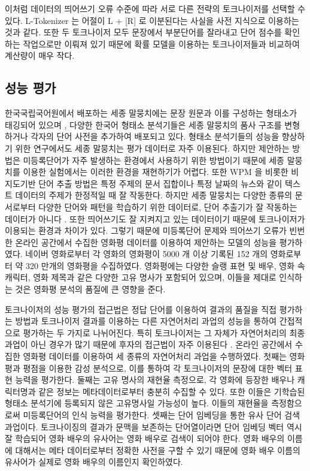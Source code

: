 \documentclass[11pt]{article}
\begin{document}
이처럼 데이터의 띄어쓰기 오류 수준에 따라 서로 다른 전략의 토크나이저를 선택할 수 있다.
L-Tokenizer 는 어절이 L + [R] 로 이분된다는 사실을 사전 지식으로 이용하는 것과 같다.
또한 두 토크나이저 모두 문장에서 부분단어를 잘라내고 단어 점수를 확인하는 작업으로만 이뤄져 있기 때문에 확률 모델을 이용하는 토크나이저들과 비교하여 계산량이 매우 작다.


\subsection{성능 평가}
한국국립국어원에서 배포하는 세종 말뭉치에는 문장 원문과 이를 구성하는 형태소가 태깅되어 있으며 \citep{kim200121st}, 다양한 한국어 형태소 분석기들은 세종 말뭉치의 품사 구조를 변형하거나 각자의 단어 사전을 추가하여 배포되고 있다.
형태소 분석기들의 성능을 향상하기 위한 연구에서도 세종 말뭉치는 평가 데이터로 자주 이용된다.
하지만 제안하는 방법은 미등록단어가 자주 발생하는 환경에서 사용하기 위한 방법이기 때문에 세종 말뭉치를 이용한 실험에서는 이러한 환경을 재현하기가 어렵다.
또한 WPM 을 비롯한 비지도기반 단어 추출 방법은 특정 주제의 문서 집합이나 특정 날짜의 뉴스와 같이 텍스트 데이터의 주제가 한정적일 때 잘 작동한다.
하지만 세종 말뭉치는 다양한 종류의 문서로부터 다양한 단어와 패턴을 학습하기 위한 데이터로, 단어 추출기가 잘 작동하는 데이터가 아니다 \citep{kim2014kr}.
또한 띄어쓰기도 잘 지켜지고 있는 데이터이기 때문에 토크나이저가 이용되는 환경과 차이가 있다.
그렇기 때문에 미등록단어 문제와 띄어쓰기 오류가 빈번한 온라인 공간에서 수집한 영화평 데이터를 이용하여 제안하는 모델의 성능을 평가하였다.
네이버 영화로부터 각 영화의 영화평이 5000 개 이상 기록된 152 개의 영화로부터 약 320 만개의 영화평을 수집하였다.
영화평에는 다양한 슬랭 표현 및 배우, 영화 속 캐릭터, 영화 제목과 같은 다양한 고유 명사가 포함되어 있으며, 이들을 제대로 인식하는 것은 영화평 분석의 품질에 큰 영향을 준다.

토크나이저의 성능 평가의 접근법은 정답 단어를 이용하여 결과의 품질을 직접 평가하는 방법과 토크나이저 결과를 이용하는 다른 자연어처리 과업의 성능을 통하여 간접적으로 평가하는 두 가지로 나뉘어진다.
특히 토크나이저는 그 자체가 자연어처리의 최종 과업이 아닌 경우가 많기 때문에 후자의 접근법이 자주 이용된다 \citep{chung2009unsupervised}.
온라인 공간에서 수집한 영화평 데이터를 이용하여 세 종류의 자연어처리 과업을 수행하였다.
첫째는 영화평과 평점을 이용한 감성 분석으로, 이를 통하여 각 토크나이저의 문장에 대한 벡터 표현 능력을 평가한다.
둘째는 고유 명사의 재현율 측정으로, 각 영화에 등장한 배우나 캐릭터명과 같은 정보는 메타데이터로부터 충분히 수집할 수 있다.
또한 이들은 기학습된 형태소 분석기에 등록되지 않은 고유명사일 가능성이 높다.
이들의 재현율을 측정함으로써 미등록단어의 인식 능력을 평가한다.
셋째는 단어 임베딩을 통한 유사 단어 검색 과업이다.
토크나이징의 결과가 문맥을 보존하는 단어열이라면 단어 임베딩 벡터 역시 잘 학습되어 영화 배우의 유사어는 영화 배우로 검색이 되어야 한다.
영화 배우의 이름에 대해서는 메타 데이터로부터 정확한 사전을 구할 수 있기 때문에 영화 배우 이름의 유사어가 실제로 영화 배우의 이름인지 확인하였다.
\end{document}
